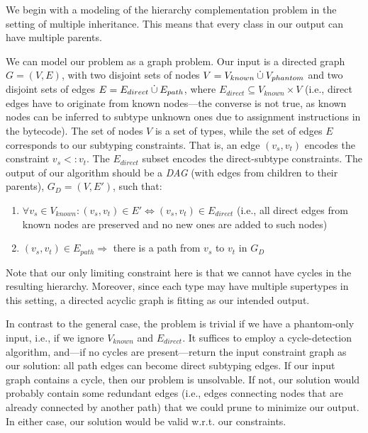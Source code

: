We begin with a modeling of the hierarchy complementation problem in
the setting of multiple inheritance. This means that every class in our
output can have multiple parents.


We can model our problem as a graph problem. Our input is a directed
graph $G = (V,E)$, with two disjoint sets of nodes $V = V_{known} \mathbin{\dot{\cup}}
V_{phantom}$ and two disjoint sets of edges $E = E_{direct} \mathbin{\dot{\cup}}
E_{path}$, where $E_{direct} \subseteq V_{known} \times V$ (i.e.,
direct edges have to originate from known nodes---the converse is not
true, as known nodes can be inferred to subtype unknown ones due to
assignment instructions in the bytecode). The set of nodes $V$ is a
set of types, while the set of edges $E$ corresponds to our subtyping
constraints. That is, an edge $(v_s,v_t)$ encodes the constraint $v_s
<: v_t$. The $E_{direct}$ subset encodes the direct-subtype
constraints. The output of our algorithm should be a \emph{DAG} (with
edges from children to their parents), $G_D = (V,E')$, such that:
\begin{enumerate}
\item
  $\forall v_s \in V_{known}: (v_s,v_t) \in E' \Leftrightarrow (v_s,
  v_t) \in E_{direct}$ (i.e., all direct edges from known nodes are
  preserved and no new ones are added to such nodes)
\item $(v_s,v_t) \in E_{path} \Rightarrow$ there is a path from $v_s$
  to $v_t$ in $G_D$
\end{enumerate}


Note that our only limiting constraint here is that we cannot have
cycles in the resulting hierarchy. Moreover, since each type may have
multiple supertypes in this setting, a directed acyclic graph is
fitting as our intended output.


In contrast to the general case, the problem is trivial if we have a
phantom-only input, i.e., if we ignore $V_{known}$ and
$E_{direct}$. It suffices to employ a cycle-detection algorithm,
and---if no cycles are present---return the input constraint graph as
our solution: all path edges can become direct subtyping edges. If our
input graph contains a cycle, then our problem is unsolvable.  If
not, our solution would probably contain some redundant edges (i.e.,
edges connecting nodes that are already connected by another path)
that we could prune to minimize our output. In either case, our
solution would be valid w.r.t. our constraints.

